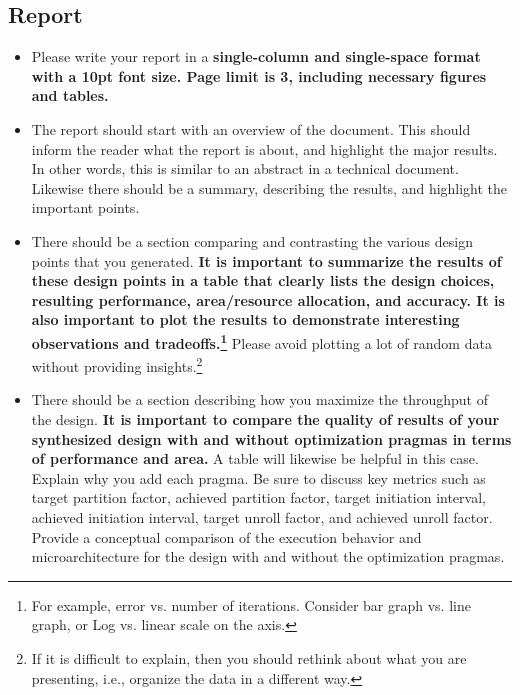 \documentclass[paper=letter, fontsize=11.6pt]{scrartcl} %
\numberwithin{equation}{section} %
\numberwithin{figure}{section} %
\numberwithin{table}{section} %
\newcommand{\fixme}[1]{\textcolor{red}{\small [~#1~]}}
\begin{document}
\subsection{Report}
   \begin{itemize}
   	\item Please write your report in a \textbf{single-column and single-space format with a 10pt font size. Page limit is 3, including necessary figures and tables.} 

	\item The report should start with an overview of the document. This should inform the reader what the report is about, and highlight the major results. In other words, this is similar to an abstract in a technical document. 
	Likewise there should be a summary, describing the results, and highlight the important points.

	\item There should be a section comparing and contrasting the various design points that you generated. \textbf{It is important to summarize the results of these design points in a table that clearly lists the design choices, resulting performance, area/resource allocation, and accuracy. It is also important to plot %
the results to demonstrate interesting observations and tradeoffs.\footnote{For example, error vs. number of iterations. Consider bar graph vs. line graph, or Log vs. linear scale on the axis.}} Please avoid plotting a lot of random data without providing insights.\footnote{If it is difficult to explain, then you should rethink about what you are presenting, i.e., organize the data in a different way.} 
	
	\item There should be a section describing how you maximize the throughput of the design. \textbf{It is important to compare the quality of results of your synthesized design with and without optimization pragmas in terms of performance and area.} A table will likewise be helpful in this case. Explain why you add each pragma. Be sure to discuss key metrics such as target partition factor, achieved partition factor, target initiation interval, achieved initiation interval, target unroll factor, and achieved unroll factor.  Provide a conceptual comparison of the execution behavior and microarchitecture for the design with and without the optimization pragmas.


\end{itemize}
\end{document}
